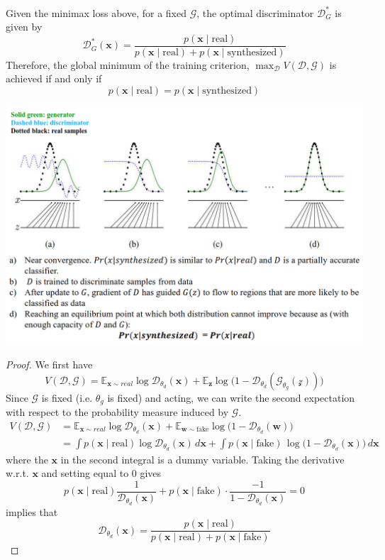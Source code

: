   \begin{theorem} 
  Given the minimax loss above, for a fixed $\mathcal{G}$, the optimal discriminator $\mathcal{D}_G^\ast$ is given by 
  \[\mathcal{D}_G^\ast (\mathbf{x}) = \frac{p(\mathbf{x} \mid \text{real})}{p(\mathbf{x} \mid \text{real}) + p(\mathbf{x} \mid \text{synthesized})}\]
  Therefore, the global minimum of the training criterion, $\max_{\mathcal{D}} V(\mathcal{D}, \mathcal{G})$ is achieved if and only if 
  \[p(\mathbf{x} \mid \text{real}) = p(\mathbf{x} \mid \text{synthesized})\]
  \begin{center}
      \includegraphics[scale=0.4]{img/09_GAN/nash_equilibrium.png}
  \end{center}
  \end{theorem}
  \begin{proof} 
  We first have 
  \[V(\mathcal{D}, \mathcal{G}) = \mathbb{E}_{\mathbf{x} \sim real} \log \mathcal{D}_{\theta_d} (\mathbf{x}) + \mathbb{E}_{\mathbf{z}} \log \big( 1 - \mathcal{D}_{\theta_d} (\mathcal{G}_{\theta_g} (\mathcal{z}))\big) \]
  Since $\mathcal{G}$ is fixed (i.e. $\theta_g$ is fixed) and acting, we can write the second expectation with respect to the probability measure induced by $\mathcal{G}$.
  \begin{align*} 
  V(\mathcal{D}, \mathcal{G}) & = \mathbb{E}_{\mathbf{x} \sim real} \log \mathcal{D}_{\theta_d} (\mathbf{x}) + \mathbb{E}_{\mathbf{w} \sim \text{fake}} \log \big( 1 - \mathcal{D}_{\theta_d} (\mathbf{w}) \big) \\   
                                  & = \int p(\mathbf{x} \mid \text{real}) \log \mathcal{D}_{\theta_d}(\mathbf{x}) \,d\mathbf{x}+ \int p(\mathbf{x} \mid \text{fake}) \, \log \big( 1 - \mathcal{D}_{\theta_d} (\mathbf{x}) \big) \,d\mathbf{x} 
  \end{align*}
  where the $\mathbf{x}$ in the second integral is a dummy variable. Taking the derivative w.r.t. $\mathbf{x}$ and setting equal to $0$ gives 
  \[p(\mathbf{x} \mid \text{real}) \frac{1}{\mathcal{D}_{\theta_d} (\mathbf{x})} + p(\mathbf{x} \mid \text{fake}) \cdot \frac{-1}{1 - \mathcal{D}_{\theta_d}(\mathbf{x})} = 0\]
  implies that 
  \[\mathcal{D}_{\theta_d}( \mathbf{x}) = \frac{p(\mathbf{x} \mid \text{real})}{p(\mathbf{x} \mid \text{real}) + p(\mathbf{x} \mid \text{fake})}\]
  \end{proof} 


